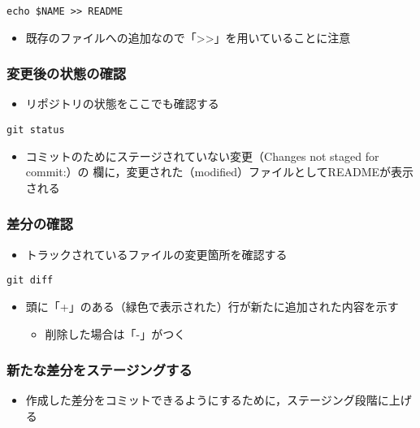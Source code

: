 \documentclass[a4paper,twoside,twocolumn]{bxjsarticle}
\begin{document}
\begin{verbatim}
echo $NAME >> README
\end{verbatim}

\begin{itemize}
\item 既存のファイルへの追加なので「>>」を用いていることに注意
\end{itemize}

\subsubsection{変更後の状態の確認}
\label{sec-1-4-2}
\begin{itemize}
\item リポジトリの状態をここでも確認する
\end{itemize}

\begin{verbatim}
git status
\end{verbatim}

\begin{itemize}
\item コミットのためにステージされていない変更（Changes not staged for commit:）の
欄に，変更された（modified）ファイルとしてREADMEが表示される
\end{itemize}

\subsubsection{差分の確認}
\label{sec-1-4-3}
\begin{itemize}
\item トラックされているファイルの変更箇所を確認する
\end{itemize}

\begin{verbatim}
git diff
\end{verbatim}

\begin{itemize}
\item 頭に「+」のある（緑色で表示された）行が新たに追加された内容を示す
\begin{itemize}
\item 削除した場合は「-」がつく
\end{itemize}
\end{itemize}

\subsubsection{新たな差分をステージングする}
\label{sec-1-4-4}
\begin{itemize}
\item 作成した差分をコミットできるようにするために，ステージング段階に上げる
\end{itemize}
\end{document}
